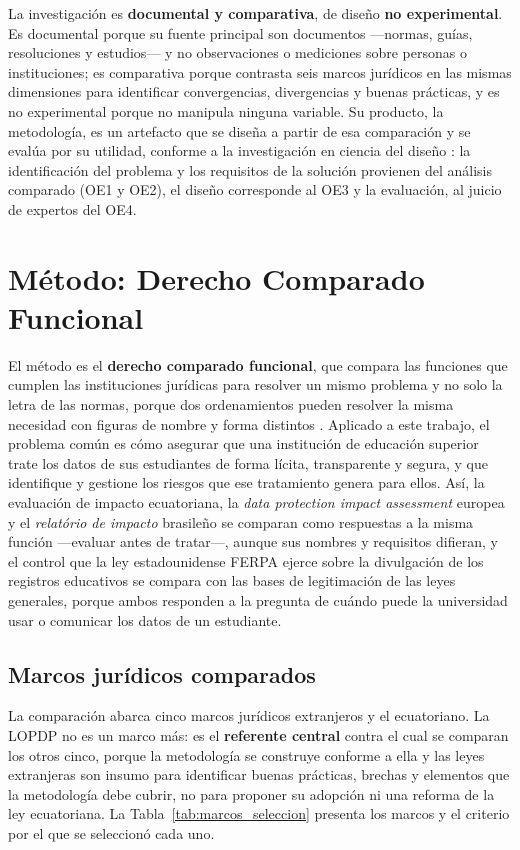 La investigación es \textbf{documental y comparativa}, de diseño \textbf{no experimental}. Es documental porque su fuente principal son documentos ---normas, guías, resoluciones y estudios--- y no observaciones o mediciones sobre personas o instituciones; es comparativa porque contrasta seis marcos jurídicos en las mismas dimensiones para identificar convergencias, divergencias y buenas prácticas, y es no experimental porque no manipula ninguna variable. Su producto, la metodología, es un artefacto que se diseña a partir de esa comparación y se evalúa por su utilidad, conforme a la investigación en ciencia del diseño \cite{hevner2004design,peffers2007dsrm}: la identificación del problema y los requisitos de la solución provienen del análisis comparado (OE1 y OE2), el diseño corresponde al OE3 y la evaluación, al juicio de expertos del OE4.

\section{Método: Derecho Comparado Funcional}
\label{sec:metodo_comparado}

El método es el \textbf{derecho comparado funcional}, que compara las funciones que cumplen las instituciones jurídicas para resolver un mismo problema y no solo la letra de las normas, porque dos ordenamientos pueden resolver la misma necesidad con figuras de nombre y forma distintos \cite{zweigert1998comparative}. Aplicado a este trabajo, el problema común es cómo asegurar que una institución de educación superior trate los datos de sus estudiantes de forma lícita, transparente y segura, y que identifique y gestione los riesgos que ese tratamiento genera para ellos. Así, la evaluación de impacto ecuatoriana, la \textit{data protection impact assessment} europea y el \textit{relatório de impacto} brasileño se comparan como respuestas a la misma función ---evaluar antes de tratar---, aunque sus nombres y requisitos difieran, y el control que la ley estadounidense FERPA ejerce sobre la divulgación de los registros educativos se compara con las bases de legitimación de las leyes generales, porque ambos responden a la pregunta de cuándo puede la universidad usar o comunicar los datos de un estudiante.

\subsection{Marcos jurídicos comparados}

La comparación abarca cinco marcos jurídicos extranjeros y el ecuatoriano. La LOPDP no es un marco más: es el \textbf{referente central} contra el cual se comparan los otros cinco, porque la metodología se construye conforme a ella y las leyes extranjeras son insumo para identificar buenas prácticas, brechas y elementos que la metodología debe cubrir, no para proponer su adopción ni una reforma de la ley ecuatoriana. La Tabla~\ref{tab:marcos_seleccion} presenta los marcos y el criterio por el que se seleccionó cada uno.

